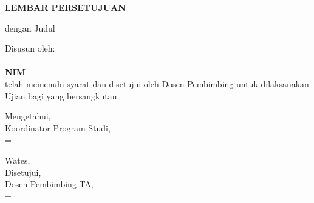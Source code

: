 
\newpage
\logowatermark

\newcommand{\smartsignature}[2]{%
    \setbox0=\hbox{#1}%
    \ifdim\wd0>0.47\textwidth
        {\small #1\\[0.3em]#2}%
    \else
        {#1\\[0.3em]#2}%
    \fi
}

\begin{center}
    \begin{doublespace}
        \textbf{\large \MakeUppercase{lembar persetujuan}}
    \end{doublespace}
\end{center}

\begin{center}
    {\tipe} dengan Judul
\end{center}

\begin{center}
    \begin{doublespace}
        \textbf{\large \MakeUppercase {\judulid}}
    \end{doublespace}
\end{center}

\begin{center}
    Disusun oleh:\\
    \textbf{\penulis}\\
    \textbf{NIM \nim}\\[1.5cm]

    telah memenuhi syarat dan disetujui oleh Dosen Pembimbing untuk dilaksanakan Ujian {\tipe} bagi yang bersangkutan.\\[0.75cm]
\end{center}

\vspace{0.75cm}
\noindent\begin{minipage}[t]{0.47\textwidth}
    \centering
    \vspace{1.5em}
    Mengetahui,\\
    Koordinator Program Studi,\\[2.5cm]
    
    \smartsignature{\koorprodi}{NIP. \NIPkoorprodi}
\end{minipage}%
\hfill%
\begin{minipage}[t]{0.47\textwidth}
    \centering
    Wates, \tglpersetujuan\\[1em]
    Disetujui,\\
    Dosen Pembimbing TA,\\[2.5cm]
    
    \smartsignature{\pembimbing}{NIP. \NIPpembimbing}
\end{minipage}%
